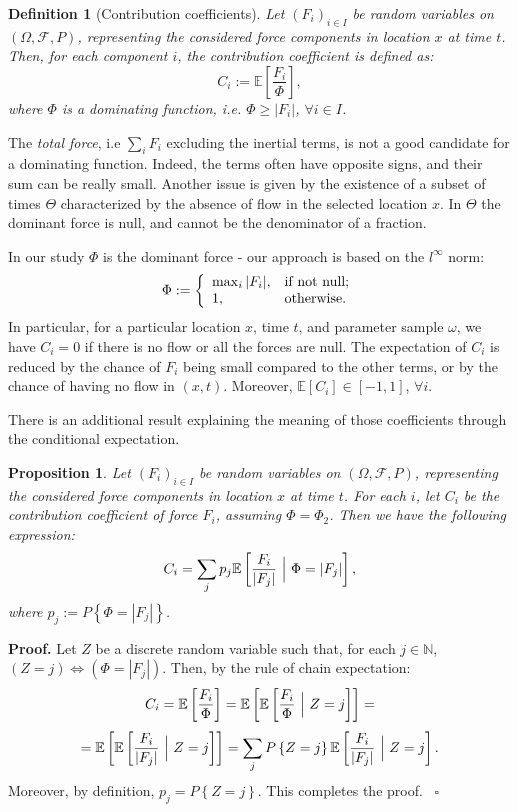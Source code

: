 \documentclass{article}
\newtheorem{definition}[theorem]{Definition}
\newtheorem{proposition}[theorem]{Proposition}
\newenvironment{proof}[1][Proof]{\noindent\textbf{#1.} }{\ $\square$}
\begin{document}
\begin{definition}[Contribution coefficients]
Let $(F_i)_{i\in I}$ be random variables on $(\Omega, \mathcal F, P)$, representing the considered force components in location $x$ at time $t$. Then, for each component $i$, the contribution coefficient is defined as:
$$C_i:=\mathbb E\left[\frac{F_i}{\Phi}\right],$$
where $\Phi$ is a dominating function, i.e. $\Phi\ge |F_i|$, $\forall i\in I$.
\end{definition}
The \emph{total force}, i.e $\sum_i F_i$ excluding the inertial terms, is not a good candidate for a dominating function. Indeed, the terms often have opposite signs, and their sum can be really small. Another issue is given by the existence of a subset of times $\Theta$ characterized by the absence of flow in the selected location $x$. In $\Theta$ the dominant force is null, and cannot be the denominator of a fraction.

In our study $\Phi$ is the dominant force - our approach is based on the $l^\infty$ norm:
$$\Phi:=\left\{
    \begin{array}{ll}
      \max_i |F_i|, & \hbox{if not null;} \\
      1, & \hbox{otherwise.}
    \end{array}
  \right.$$
In particular, for a particular location $x$, time $t$, and parameter sample $\omega$, we have $C_i=0$ if there is no flow or all the forces are null. The expectation of $C_i$ is reduced by the chance of $F_i$ being small compared to the other terms, or by the chance of having no flow in $(x,t)$. Moreover, $\mathbb E[C_i]\in[-1,1]$, $\forall i$.

There is an additional result explaining the meaning of those coefficients through the conditional expectation.
\begin{proposition}
Let $(F_i)_{i\in I}$ be random variables on $(\Omega, \mathcal F, P)$, representing the considered force components in location $x$ at time $t$. For each $i$, let $C_i$ be the contribution coefficient of force $F_i$, assuming $\Phi=\Phi_2$. Then we have the following expression:
$$C_i=\sum_j p_j \mathbb E\left[\frac{F_i}{|F_j|}\ \Big{|}\ \Phi=|F_j|\right],$$
where $p_j:=P\left\{\Phi=|F_j|\right\}$.
\end{proposition}

\begin{proof}
Let $Z$ be a discrete random variable such that, for each $j\in\mathbb N$, $(Z=j) \Longleftrightarrow (\Phi=|F_j|)$. Then, by the rule of chain expectation:
$$C_i=\mathbb E\left[\frac{F_i}{\Phi}\right]=\mathbb E\left[\mathbb E\left[\frac{F_i}{\Phi}\ \Big{|}\ Z=j\right]\right]=$$
$$=\mathbb E\left[\mathbb E\left[\frac{F_i}{|F_j|}\ \Big{|}\ Z=j\right]\right]=\sum_j P\left\{Z=j\right\} \mathbb E\left[\frac{F_i}{|F_j|}\ \Big{|}\ Z=j\right].$$
Moreover, by definition, $p_j=P\left\{Z=j\right\}$. This completes the proof.
\end{proof}
\end{document}
